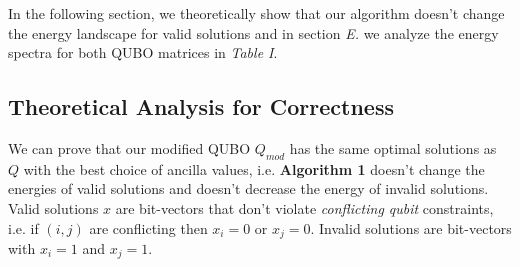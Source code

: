 \documentclass[conference]{IEEEtran}
\theoremstyle{plain}
\theoremstyle{definition}
\theoremstyle{remark}
\begin{document}
In the following section, we theoretically show that our algorithm doesn't change the energy landscape for valid solutions and in section \textit{E.} we analyze the energy spectra for both QUBO matrices in \textit{Table I}.


\subsection{Theoretical Analysis for Correctness}
We can prove that our modified QUBO $Q_{mod}$ has the same optimal solutions as $Q$ with the best choice of ancilla values, i.e. \textbf{Algorithm 1} doesn't change the energies of valid solutions and doesn't decrease the energy of invalid solutions. Valid solutions $x$ are bit-vectors that don't violate \textit{conflicting qubit} constraints, i.e. if $(i,j)$ are conflicting then $x_i = 0$ or $x_j = 0$. Invalid solutions are bit-vectors with $x_i = 1$ and $x_j = 1$. 
\end{document}
